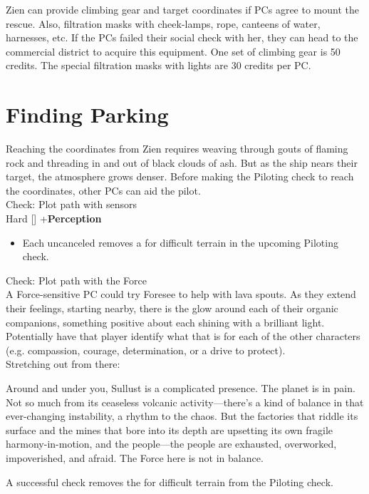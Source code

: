 \documentclass{book}
\newcommand{\df}{\difficulty}
\begin{document}
\begin{multicols*}{2}
Zien can provide climbing gear and target coordinates if PCs agree to mount the rescue. Also, filtration masks with cheek-lamps, rope, canteens of water, harnesses, etc. If the PCs failed their social check with her, they can head to the commercial district to acquire this equipment. One set of climbing gear is 50 credits. The special filtration masks with lights are 30 credits per PC.


\section{Finding Parking}

Reaching the coordinates from Zien requires weaving through gouts of flaming rock and threading in and out of black clouds of ash. But as the ship nears their target, the atmosphere grows denser. Before making the Piloting check to reach the coordinates, other PCs can aid the pilot.\\
Check: Plot path with sensors\\
Hard [\df\df\df] +\setback  \textbf{Perception}
\begin{itemize}
\item \success Each uncanceled \success removes a \setback for difficult terrain in the upcoming Piloting check.
\end{itemize}
Check: Plot path with the Force\\
A Force-sensitive PC could try Foresee to help with lava spouts. As they extend their feelings, starting nearby, there is the glow around each of their organic companions, something positive about each shining with a brilliant light. Potentially have that player identify what that is for each of the other characters (e.g. compassion, courage, determination, or a drive to protect).\\
Stretching out from there: \\
\begin{quoting}
Around and under you, Sullust is a complicated presence. The planet is in pain. Not so much from its ceaseless volcanic activity—there’s a kind of balance in that ever-changing instability, a rhythm to the chaos. But the factories that riddle its surface and the mines that bore into its depth are upsetting its own fragile harmony-in-motion, and the people—the people are exhausted, overworked, impoverished, and afraid. The Force here is not in balance.
\end{quoting}

A successful check removes the \setback\setback\setback for difficult terrain from the Piloting check.


\end{multicols*}
\end{document}
